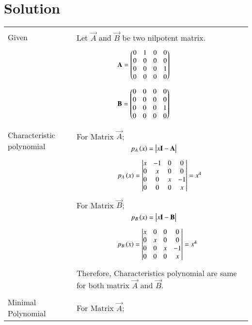 \documentclass[journal,12pt]{IEEEtran}
\begin{document}
\section{\textbf{Solution}}
\renewcommand{\thetable}{2}
\begin{longtable}{|p{5cm}|p{13cm}|}
    \hline
    \multirow{3}{*}{Given} 
    &\\
    & Let $\vec{A}$ and $\vec{B}$ be two nilpotent matrix.\\
    &\\
    &$\qquad\qquad\qquad \mathbf{A}=\begin{pmatrix}0&1&0&0\\0&0&0&0\\0&0&0&1\\0&0&0&0\end{pmatrix}$\\
    &\\
    &$\qquad\qquad\qquad\mathbf{B}=\begin{pmatrix}0&0&0&0\\0&0&0&0\\0&0&0&1\\0&0&0&0\end{pmatrix}$\\
    &\\
    \hline
	\multirow{3}{*}{Characteristic polynomial} 
	& \\
	& For Matrix $\vec{A}$;\\
	& $\qquad\qquad\qquad\qquad p_A\brak{x}=\mydet{x\Vec{I}-\Vec{A}}$\\
	&\\
	& $\qquad\qquad\qquad p_A\left(x\right)=\begin{vmatrix}x&-1&0&0\\0&x&0&0\\0&0&x&-1\\0&0&0&x\end{vmatrix} = x^4$\\
	&\\
	& For Matrix $\vec{B}$; \\
	& $\qquad\qquad\qquad\qquad p_B\brak{x}=\mydet{x\Vec{I}-\Vec{B}}$\\
	&\\
	& $\qquad\qquad\qquad p_B\left(x\right)= \begin{vmatrix}x&0&0&0\\0&x&0&0\\0&0&x&-1\\0&0&0&x\end{vmatrix} = x^4$\\
	&\\
	& Therefore, Characteristics polynomial are same for both matrix $\vec{A}$ and $\vec{B}$.\\
	&\\
	\hline
	\multirow{3}{*}{Minimal Polynomial} & \\
	& For Matrix $\vec{A}$;\\
	&\\

\end{longtable}
\end{document}
